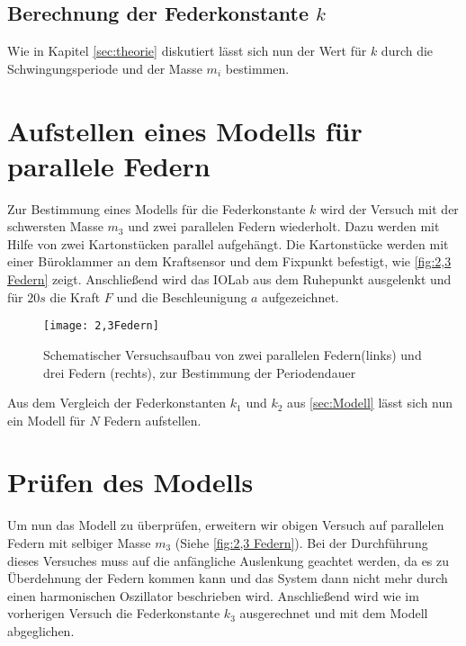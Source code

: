\subsection{Berechnung der Federkonstante \( k \)}
Wie in Kapitel \autoref{sec:theorie} diskutiert lässt sich nun der Wert für $k$ durch die Schwingungsperiode und der Masse $m_i$ bestimmen.
\section{Aufstellen eines Modells für parallele Federn}
\label{sec:Modell}
Zur Bestimmung eines Modells für die Federkonstante $k$ wird der Versuch mit der schwersten  Masse $m_3$ und zwei parallelen Federn wiederholt. Dazu werden mit Hilfe von zwei Kartonstücken parallel aufgehängt. Die Kartonstücke werden mit einer Büroklammer an dem Kraftsensor und dem Fixpunkt befestigt, wie \autoref{fig:2,3 Federn} zeigt. Anschließend wird das IOLab aus dem Ruhepunkt ausgelenkt und für $20s$ die Kraft $F$ und die Beschleunigung $a$ aufgezeichnet.
\begin{figure}[H]
	\centering
	\texttt{[image: 2,3Federn]}
	\caption[Versuchsaufbau mit mehreren Federn]{Schematischer Versuchsaufbau von zwei parallelen Federn(links) und drei Federn (rechts), zur Bestimmung der Periodendauer}
	\label{fig:2,3 Federn}
\end{figure}
Aus dem Vergleich der Federkonstanten $k_1$ und $k_2$ aus \autoref{sec:Modell} lässt sich nun ein Modell für $N$ Federn aufstellen.
\section{Prüfen des Modells}
Um nun das Modell zu überprüfen, erweitern wir obigen Versuch auf parallelen Federn mit selbiger Masse $m_3$ (Siehe \autoref{fig:2,3 Federn}). Bei der Durchführung dieses Versuches muss auf die anfängliche Auslenkung geachtet werden, da es zu Überdehnung der Federn kommen kann und das System dann nicht mehr durch einen harmonischen Oszillator beschrieben wird. Anschließend wird wie im vorherigen Versuch die Federkonstante \( k_3 \) ausgerechnet und mit dem Modell abgeglichen.